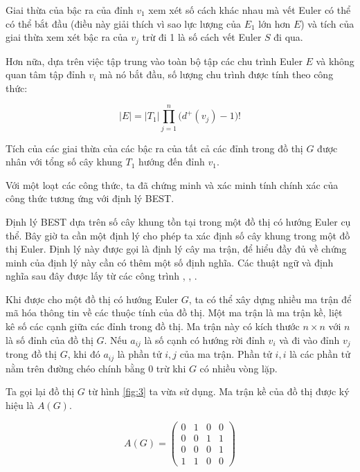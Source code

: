 \documentclass[14pt, a4paper]{article}
\numberwithin{equation}{section}
\numberwithin{figure}{section}
\numberwithin{dl}{section}
\numberwithin{md}{section}
\numberwithin{bd}{section}
\numberwithin{dn}{section}
\numberwithin{hq}{section}
\begin{document}
    Giai thừa của bậc ra của đỉnh $v_1$ xem xét số cách khác nhau mà vết Euler có thể có thể bắt đầu (điều này giải thích vì sao lực lượng của $E_1$ lớn hơn $E$) và tích của giai thừa xem xét bậc ra của $v_j$ trừ đi 1 là số cách vết Euler $S$ đi qua.

    Hơn nữa, dựa trên việc tập trung vào toàn bộ tập các chu trình Euler $E$ và không quan tâm tập đỉnh $v_i$ mà nó bắt đầu, số lượng chu trình được tính theo công thức:

    \begin{equation}
        \lvert E \rvert = \lvert T_1 \rvert \prod_{j=1}^n \big( d^+ (v_j) - 1 \big) !
    \end{equation}

    Tích của các giai thừa của các bậc ra của tất cả các đỉnh trong đồ thị $G$ được nhân với tổng số cây khung $T_1$ hướng đến đỉnh $v_1$.
    
    Với một loạt các công thức, ta đã chứng minh và xác minh tính chính xác của công thức tương ứng với định lý BEST.

    Định lý BEST dựa trên số cây khung  tồn tại trong một đồ thị có hướng Euler cụ thể.
    Bây giờ ta cần một định lý cho phép ta xác định số cây khung trong một đồ thị Euler.
    Định lý này được gọi là định lý cây ma trận, để hiểu đầy đủ về chứng minh của định lý này  cần có thêm một số định nghĩa.
    Các thuật ngữ và định nghĩa sau đây được lấy từ các công trình \cite{fleischner1990eulerian}, \cite{bollobas1998graduate}, \cite{pevzner2000computational}.

    Khi được cho một đồ thị có hướng Euler $G$, ta có thể xây dựng nhiều ma trận để mã hóa thông tin về các thuộc tính của đồ thị.
    Một ma trận là ma trận kề, liệt kê số các cạnh giữa các đỉnh trong đồ thị.
    Ma trận này có kích thước $n \times n$ với $n$ là số đỉnh của đồ thị $G$.
    Nếu $a_{ij}$ là số cạnh có hướng rời đỉnh $v_i$ và đi vào đỉnh $v_j$ trong đồ thị $G$, khi đó $a_{ij}$ là phần tử $i, j$ của ma trận.
    Phần tử $i, i$ là các phần tử nằm trên đường chéo chính bằng 0 trừ khi $G$ có nhiều vòng lặp.

    Ta gọi lại đồ thị $G$ từ hình \ref{fig:3} ta vừa sử dụng.
    Ma trận kề của đồ thị được ký hiệu là $A(G)$.

    \begin{equation*}
        A(G) = \begin{pmatrix}
            0 & 1 & 0 & 0 \\ 
            0 & 0 & 1 & 1 \\ 
            0 & 0 & 0 & 1 \\ 
            1 & 1 & 0 & 0
        \end{pmatrix}
    \end{equation*}
\end{document}
